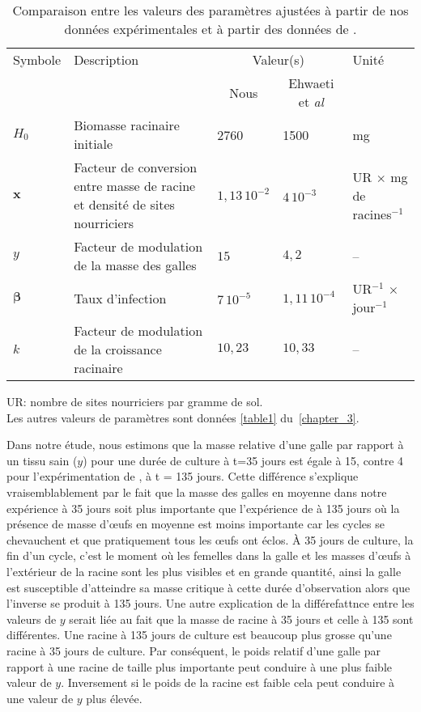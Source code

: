 \begin{table}[ht]
	\caption{Comparaison entre les valeurs des  paramètres ajustées à partir de nos données  expérimentales  et  à   
	partir des données de  \citet{Ehwaeti1998}.}
	\small
	{\renewcommand{\arraystretch}{1.5}
	\begin{tabularx}{\linewidth}{lXlll}
	\hline
	Symbole & Description      &\multicolumn{2}{c}{Valeur(s)} & Unité \\
	&       & \multicolumn{1}{c}{Nous} & \multicolumn{1}{c}{Ehwaeti et \textit{al}} &   \\ \hline
	$H_0$   & Biomasse racinaire initiale                    &2760       & 1500    &   mg\\
	$\boldsymbol{x}$  &  Facteur de conversion entre masse de racine et densité de sites nourriciers & $ 1,13\,10^{-2}$      
	&  $4\,10^{-3}$   &   UR $\times$ mg de racines$^{-1}$ \\
	$y$     & Facteur de modulation de la masse des galles     & $15 $        & $4,2$ & --   \\
	$\boldsymbol{\beta}$ & Taux d'infection   & $7\,10^{-5}$   & $1,11\,10^{-4}$ & UR$^{-1}$ $\times$ jour$^{-1}$ \\
    $k$     & Facteur de modulation de la croissance racinaire &  $10,23$     &  $10,33$ &  -- \\ \hline
	\end{tabularx}
	}
	UR: nombre de sites nourriciers par gramme de sol.\\
	Les autres valeurs de paramètres sont données \autoref{table1} du~\autoref{chapter_3}.
	
	   \label{comp:para}
\end{table}
	
	
	 Dans notre étude, nous estimons que la masse relative  d'une galle par rapport à un tissu sain ($y$) pour une durée de culture à t=35 jours  est égale à 15, contre 4 pour l'expérimentation de \citet{Ehwaeti1998}, à t = 135 jours. Cette différence s'explique vraisemblablement par le fait que la masse des galles en moyenne dans notre expérience  à 35 jours soit  plus importante que l'expérience de \citet{Ehwaeti1998} à 135 jours où la présence de masse d’œufs en moyenne est moins importante car les cycles se chevauchent et que pratiquement tous les œufs ont éclos. À 35 jours de culture, la fin d'un cycle,  c'est le moment où les  femelles dans la galle et les masses d’œufs à l’extérieur de la racine sont les plus visibles et en grande  quantité, ainsi la galle est susceptible d’atteindre sa masse critique à cette durée d'observation alors que l'inverse se produit à 135 jours. Une autre explication de la différefattnce entre les valeurs de $y$  serait liée au fait que la masse de racine à 35 jours et celle à 135 sont différentes. Une racine à 135 jours de culture est beaucoup plus grosse qu'une racine à 35 jours de culture. Par conséquent, le poids relatif d'une galle par rapport à une racine de taille plus importante  peut conduire à une plus faible valeur de $y$. Inversement si le poids de la racine est faible cela peut conduire à une valeur de $y$ plus élevée.
	 
